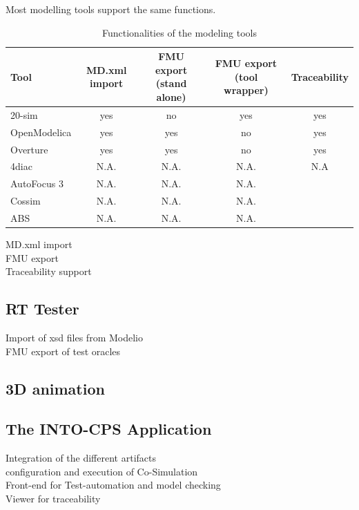 Most modelling tools support the same functions.


\begin{table}[ht]
	\centering
		\begin{tabular}{l|c|c|c|c}
			Tool & MD.xml import & FMU export (stand alone) & FMU export (tool wrapper) & Traceability\\
			\hline
			20-sim & yes & no & yes & yes\\
			OpenModelica & yes & yes & no & yes\\
			Overture & yes & yes & no & yes\\
			4diac & N.A. & N.A. & N.A. & N.A \\
			AutoFocus 3 & N.A. & N.A. & N.A. \\
			Cossim & N.A. & N.A. & N.A. \\
			ABS & N.A. & N.A. & N.A. \\
		\end{tabular}
	\caption{Functionalities of the modeling tools}
	\label{tab:FunctionalitiesOfTheModelingTools}
\end{table}

MD.xml import\\
FMU export\\
Traceability support\\

\subsection{RT Tester}

Import of xsd files from Modelio\\
FMU export of test oracles \\

\subsection{3D animation}

\subsection{The INTO-CPS Application}

Integration of the different artifacts\\ 
configuration and execution of Co-Simulation\\
Front-end for Test-automation and model checking\\
Viewer for traceability\\
